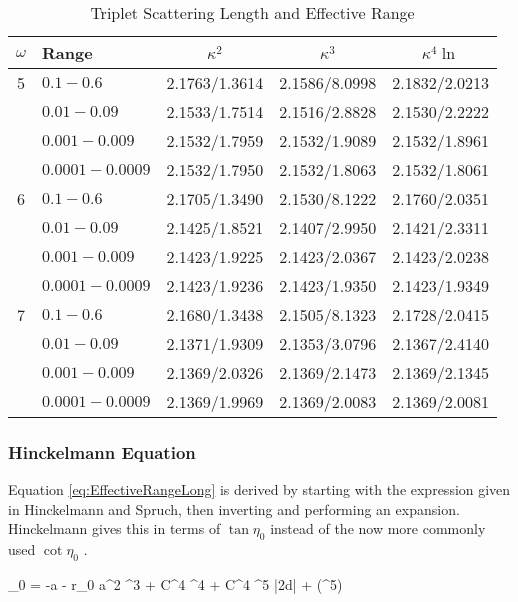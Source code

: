 \documentclass[Dissertation.tex]{subfiles}
\begin{document}
\begin{table}[H]
\begin{center}
\begin{tabular}{c l c c c}
\toprule
$\omega$ & Range & $\kappa^2$ & $\kappa^3$ & $\kappa^4 \ln$ \\
\midrule
5 & $0.1 - 0.6$ & 2.1763/1.3614 & 2.1586/8.0998 & 2.1832/2.0213 \\
  & $0.01 - 0.09$ & 2.1533/1.7514 & 2.1516/2.8828 & 2.1530/2.2222 \\
  & $0.001 - 0.009$ & 2.1532/1.7959 & 2.1532/1.9089 & 2.1532/1.8961 \\
  & $0.0001 - 0.0009$ & 2.1532/1.7950 & 2.1532/1.8063 & 2.1532/1.8061 \\
\midrule
6 & $0.1 - 0.6$ & 2.1705/1.3490 & 2.1530/8.1222 & 2.1760/2.0351 \\
  & $0.01 - 0.09$ & 2.1425/1.8521 & 2.1407/2.9950 & 2.1421/2.3311 \\
  & $0.001 - 0.009$ & 2.1423/1.9225 & 2.1423/2.0367 & 2.1423/2.0238 \\
  & $0.0001 - 0.0009$ & 2.1423/1.9236 & 2.1423/1.9350 & 2.1423/1.9349 \\
\midrule
7 & $0.1 - 0.6$ & 2.1680/1.3438 & 2.1505/8.1323 & 2.1728/2.0415 \\
  & $0.01 - 0.09$ & 2.1371/1.9309 & 2.1353/3.0796 & 2.1367/2.4140 \\
  & $0.001 - 0.009$ & 2.1369/2.0326 & 2.1369/2.1473 & 2.1369/2.1345 \\
  & $0.0001 - 0.0009$ & 2.1369/1.9969 & 2.1369/2.0083 & 2.1369/2.0081 \\  
\bottomrule
\end{tabular}
\caption{Triplet Scattering Length and Effective Range}
\label{tab:ScatLenTriplet}
\end{center}
\end{table}
 



\subsubsection{Hinckelmann Equation}
Equation \ref{eq:EffectiveRangeLong} is derived by starting with the expression given in Hinckelmann and Spruch, then inverting and performing an expansion. Hinckelmann gives this in terms of $\tan\eta_0$ instead of the now more commonly used $\cot\eta_0$ \cite{Hinckelmann1971}.

\beq
\label{eq:HinckelmannEqn}
\tan\eta_0 = -a \kappa -  r_0 a^2 \kappa^3 +  C^4 \kappa^4 +  C^4 \kappa^5 \ln|2\kappa d| + (\kappa^5)
\eeq
\end{document}
